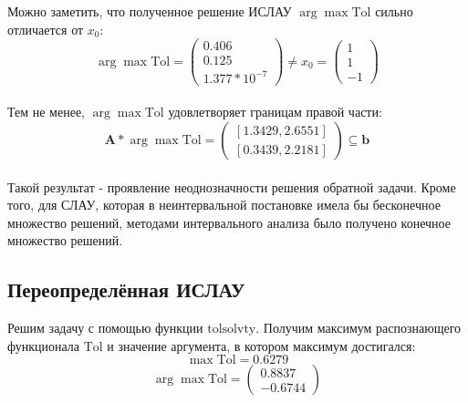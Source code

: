 Можно заметить, что полученное решение ИСЛАУ $\arg \max \text{Tol}$ сильно отличается от $x_0$: \\
\begin{equation}
	\arg \max \text{Tol}=
	\begin{pmatrix}
		0.406 \\
		0.125 \\
		1.377 * 10^{-7}
	\end{pmatrix} \neq x_0 = 
	\begin{pmatrix}
		1 \\
		1 \\
		-1
	\end{pmatrix}
\end{equation} \\
Тем не менее, $\arg \max \text{Tol}$ удовлетворяет границам правой части:
\begin{equation}
	\textbf{A} * \arg \max \text{Tol} = 
		\begin{pmatrix}
			[1.3429, 2.6551]  \\
			[0.3439, 2.2181] 
		\end{pmatrix}
	\subseteq \textbf{b}
\end{equation} \\
Такой результат - проявление неоднозначности решения обратной задачи. Кроме того, для СЛАУ, которая в неинтервальной постановке имела бы бесконечное множество решений, методами интервального анализа было получено конечное множество решений.



\subsection{Переопределённая ИСЛАУ}
Решим задачу с помощью функции $\text{tolsolvty}$. Получим максимум распознающего функционала $\text{Tol}$ и значение аргумента, в котором максимум достигался:
\begin{equation}
	\max \text{Tol} = 0.6279
\end{equation}
\begin{equation}
	\arg \max \text{Tol}=
	\begin{pmatrix}
		0.8837 \\
		-0.6744
	\end{pmatrix}
\end{equation}

